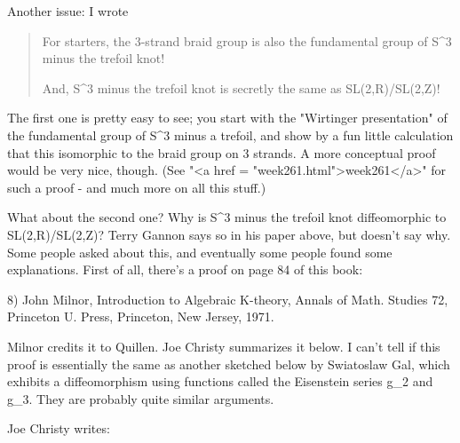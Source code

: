Another issue: I wrote

\begin{quote}
For starters, the 3-strand braid group is also the fundamental group of 
S^{3} minus the trefoil knot!

And, S^{3} minus the trefoil knot is secretly the same as
SL(2,R)/SL(2,Z)!
\end{quote}

The first one is pretty easy to see; you start with the "Wirtinger 
presentation" of the fundamental group of S^{3} minus a 
trefoil, and show by a fun little calculation that this isomorphic to the 
braid group on 3 strands.  A more conceptual proof would be very nice, though.
(See "<a href = "week261.html">week261</a>" for such a proof -
and much more on all this stuff.)

What about the second one?  Why is  S^{3} minus the trefoil knot 
diffeomorphic
to SL(2,R)/SL(2,Z)?   Terry Gannon says so in his paper above, but doesn't
say why.  Some people asked about this, and eventually some people found
some explanations.  First of all, there's a proof on page 84 of this book:

8) John Milnor, Introduction to Algebraic K-theory, Annals of Math.
Studies 72, Princeton U. Press, Princeton, New Jersey, 1971.

Milnor credits it to Quillen.  Joe Christy summarizes it below.  I
can't tell if this proof is essentially the same as another sketched
below by Swiatoslaw Gal, which exhibits a diffeomorphism using
functions called the Eisenstein series g_{2} and
g_{3}.  They are probably quite similar arguments.

Joe Christy writes:

